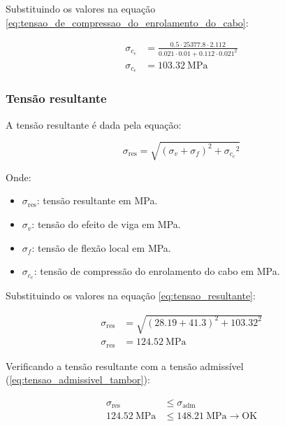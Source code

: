 \vspace{1em}

Substituindo os valores na equação \eqref{eq:tensao_de_compressao_do_enrolamento_do_cabo}:

\begin{align*}
  \sigma_{c_e} & = \frac{\num{0.5} \cdot \num{25377.8} \cdot \num{2.112}}{\num{0.021} \cdot \num{0.01} + \num{0.112} \cdot \num{0.021}^2} \\
  \sigma_{c_e} & = \boxed{\SI{103.32}{\mega\pascal}}
\end{align*}

\subsubsection{Tensão resultante}

A tensão resultante é dada pela equação:

\begin{equation}
  \sigma_{\text{res}} = \sqrt{{\left(\sigma_v + \sigma_f\right)}^2 + {\sigma_{c_e}}^2}
  \label{eq:tensao_resultante}
\end{equation}

Onde:

\begin{itemize}
  \item $\sigma_{\text{res}}$: tensão resultante em \si{\mega\pascal}.
  \item $\sigma_v$: tensão do efeito de viga em \si{\mega\pascal}.
  \item $\sigma_f$: tensão de flexão local em \si{\mega\pascal}.
  \item $\sigma_{c_e}$: tensão de compressão do enrolamento do cabo em \si{\mega\pascal}.
\end{itemize}

\vspace{1em}

Substituindo os valores na equação \eqref{eq:tensao_resultante}:

\begin{align*}
  \sigma_{\text{res}} & = \sqrt{{\left(\num{28.19} + \num{41.3}\right)}^2 + {\num{103.32}}^2} \\
  \sigma_{\text{res}} & = \boxed{\SI{124.52}{\mega\pascal}}
\end{align*}

Verificando a tensão resultante com a tensão admissível (\eqref{eq:tensao_admissivel_tambor}):

\begin{align*}
  \sigma_{\text{res}}       & \le \sigma_{\text{adm}}                             \\
  \SI{124.52}{\mega\pascal} & \le \SI{148.21}{\mega\pascal} \rightarrow \text{OK}
\end{align*}
